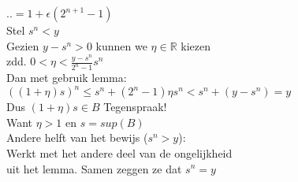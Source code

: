 \begin{multicols}{2}
{{		$..=1+\epsilon(2^{n+1}-1)$
	}\\
	Stel $s^n < y$\\
	Gezien $y - s^n > 0$ kunnen we $\eta \in \mathbb{R}$ kiezen\\
	zdd. $0 < \eta < \frac{y-s^n}{2^n-1}s^n$\\
	Dan met gebruik lemma:\\
	$((1+\eta)s)^n \leq s^n +(2^n -1)\eta s^n < s^n + (y - s^n) = y$\\
	Dus $(1 + \eta)s \in B$ Tegenspraak!\\
	Want $\eta > 1$ en $s = sup(B)$\\
	Andere helft van het bewijs ($s^n > y$):\\
	Werkt met het andere deel van de ongelijkheid\\
	uit het lemma. Samen zeggen ze dat $s^n = y$
}

\end{multicols}